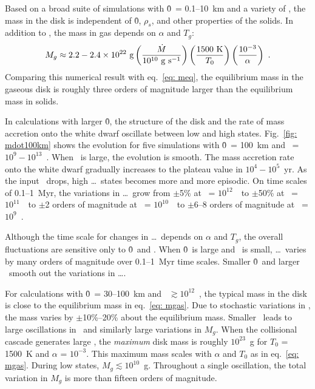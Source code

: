 \documentclass[12pt,preprint]{aastex}
\begin{document}
Based on a broad suite of simulations with \r0\ = 0.1--10~km and a variety of \mdotz,
the mass in the disk is independent of \r0, $\rho_s$, and other properties of the solids.
In addition to \mdotz, the mass in gas depends on $\alpha$ and $T_g$:
\begin{equation}
M_g \approx 2.2 - 2.4 \times 10^{22}~{\rm g} 
\left ( { \dot{M} \over 10^{10}~{\rm g~s^{-1}} } \right )
\left ( { {\rm 1500~K} \over T_0 } \right )
\left ( { 10^{-3} \over \alpha } \right ) ~ .
\label{eq: mgas}
\end{equation}
Comparing this numerical result with eq.~\ref{eq: meq}, the equilibrium mass in the gaseous 
disk is roughly three orders of magnitude larger than the equilibrium mass in solids.

In calculations with larger \r0, the structure of the disk and the rate of mass accretion 
onto the white dwarf oscillate between low and high states. Fig.~\ref{fig: mdot100km} shows 
the evolution for five simulations with \r0\ = 100~km and \mdotz\ = $10^9 - 10^{13}$~\gs. 
When \mdotz\ is large, the evolution is smooth. The mass accretion rate onto the white dwarf 
gradually increases to the plateau value in $10^4 - 10^5$~yr.  As the input \mdotz\ drops, 
high \mdots\ states becomes more and more episodic. On time scales of 0.1--1~Myr, the 
variations in \mdots\ grow from $\pm$5\% at \mdotz\ = $10^{12}$~\gs\ to $\pm$50\% at 
\mdotz\ = $10^{11}$~\gs\ to $\pm$2 orders of magnitude at \mdotz\ = $10^{10}$~\gs\ to 
$\pm$6--8 orders of magnitude at \mdotz\ = $10^{9}$~\gs. 

Although the time scale for changes in \mdots\ depends on $\alpha$ and $T_g$, the overall 
fluctuations are sensitive only to \r0\ and \mdotz. When \r0\ is large and \mdotz\ is small, 
\mdots\ varies by many orders of magnitude over 0.1--1~Myr time scales. Smaller \r0\ and 
larger \mdotz\ smooth out the variations in \mdots.

For calculations with \r0\ = 30--100~km and \mdotz\ $\gtrsim 10^{12}$~\gs, the typical 
mass in the disk is close to the equilibrium mass in eq.~\ref{eq: mgas}. Due to stochastic 
variations in \mdotv, the mass varies by $\pm$10\%--20\% about the equilibrium mass. 
Smaller \mdotz\ leads to large oscillations in \mdotv\ and similarly large variations 
in $M_g$.  When the collisional cascade generates large \mdotv, the \textit{maximum} disk 
mass is roughly $10^{23}$~g for $T_0$ = 1500~K and $\alpha$ = $10^{-3}$.  This maximum 
mass scales with $\alpha$ and $T_0$ as in eq.~\ref{eq: mgas}.  During low states, 
$M_g \lesssim 10^{10}$~g. Throughout a single oscillation, the total variation in 
$M_g$ is more than fifteen orders of magnitude.
\end{document}
